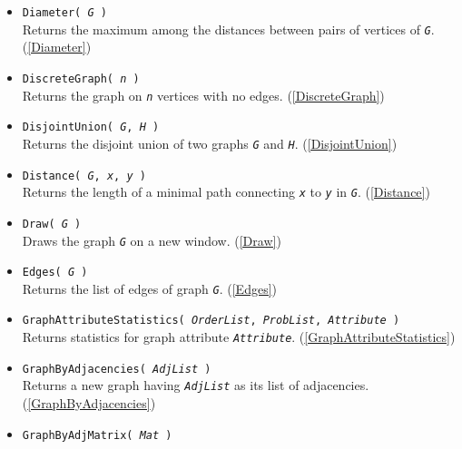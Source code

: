 \documentclass[a4paper,11pt]{report}
\begin{document}
{{\begin{itemize}
 Returns the cyclic graph on \mbox{\texttt{\mdseries\slshape n}} vertices. (\ref{CycleGraph}) 
\item \texttt{Diameter( \mbox{\texttt{\mdseries\slshape G}} )}\\
 Returns the maximum among the distances between pairs of vertices of \mbox{\texttt{\mdseries\slshape G}}. (\ref{Diameter}) 
\item \texttt{DiscreteGraph( \mbox{\texttt{\mdseries\slshape n}} )}\\
 Returns the graph on \mbox{\texttt{\mdseries\slshape n}} vertices with no edges. (\ref{DiscreteGraph}) 
\item \texttt{DisjointUnion( \mbox{\texttt{\mdseries\slshape G}}, \mbox{\texttt{\mdseries\slshape H}} )}\\
 Returns the disjoint union of two graphs \mbox{\texttt{\mdseries\slshape G}} and \mbox{\texttt{\mdseries\slshape H}}. (\ref{DisjointUnion}) 
\item \texttt{Distance( \mbox{\texttt{\mdseries\slshape G}}, \mbox{\texttt{\mdseries\slshape x}}, \mbox{\texttt{\mdseries\slshape y}} )}\\
 Returns the length of a minimal path connecting \mbox{\texttt{\mdseries\slshape x}} to \mbox{\texttt{\mdseries\slshape y}} in \mbox{\texttt{\mdseries\slshape G}}. (\ref{Distance}) 
\item \texttt{Draw( \mbox{\texttt{\mdseries\slshape G}} )}\\
 Draws the graph \mbox{\texttt{\mdseries\slshape G}} on a new window. (\ref{Draw}) 
\item \texttt{Edges( \mbox{\texttt{\mdseries\slshape G}} )}\\
 Returns the list of edges of graph \mbox{\texttt{\mdseries\slshape G}}. (\ref{Edges}) 
\item \texttt{GraphAttributeStatistics( \mbox{\texttt{\mdseries\slshape OrderList}}, \mbox{\texttt{\mdseries\slshape ProbList}}, \mbox{\texttt{\mdseries\slshape Attribute}} )}\\
 Returns statistics for graph attribute \mbox{\texttt{\mdseries\slshape Attribute}}. (\ref{GraphAttributeStatistics}) 
\item \texttt{GraphByAdjacencies( \mbox{\texttt{\mdseries\slshape AdjList}} )}\\
 Returns a new graph having \mbox{\texttt{\mdseries\slshape AdjList}} as its list of adjacencies. (\ref{GraphByAdjacencies}) 
\item \texttt{GraphByAdjMatrix( \mbox{\texttt{\mdseries\slshape Mat}} )}\\

\end{itemize}}}
\end{document}
